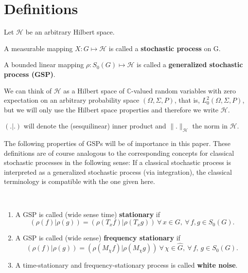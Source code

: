 \documentclass[graybox]{svmult}
\begin{document}
\section{Definitions}
\label{ch18:sec1}

\begin{definition}\label{ch18:def1}
Let $\mathcal{H}$ be an arbitrary Hilbert space.

A measurable mapping $X:G \mapsto \mathcal{H}$ is called a \textbf{stochastic process} on G.
\end{definition}

\begin{definition}\label{ch18:def2}
A bounded linear mapping $\rho :{S_{0}(G)} \mapsto \mathcal{H}$ is called a
\textbf{generalized stochastic process (GSP)}.
\end{definition}

We can think of $\mathcal{H}$ as a Hilbert space of
$\mathbb{C}$-valued random
variables with zero expectation on an arbitrary probability space
$(\varOmega ,\varSigma ,P)$, that is, $L^{2}_{0}(\varOmega ,\varSigma ,P)$, but we
will only use the Hilbert space properties and therefore we write $\mathcal{H}$.

$(.| .)$ will denote the (sesquilinear) inner
product and $\| .\| _{\mathcal{H}}$ the norm in $\mathcal{H}$.

The following properties of GSPs will be of importance in this paper.
These definitions are of course analogous to the corresponding concepts
for classical stochastic processes in the following sense:
If a classical stochastic process is interpreted as a
generalized stochastic process (via integration), the classical
terminology is compatible with the one given here.

\begin{definition}\label{ch18:def3}\
\begin{enumerate}
\item[(a)] A GSP is called (wide sense time) \textbf{stationary} if
\[
(\rho (f)| \rho (g)) = (\rho (T_{x}f)| \rho (T_{x}g)) \ \forall \, x
\in G, \ \forall \, f,g \in {S_{0}(G)}.
\]

\item[(b)] A GSP is called (wide sense) \textbf{frequency stationary} if
\[
(\rho (f)| \rho (g)) = (\rho (M_{\chi}f)| \rho (M_{\chi}g)) \ \forall \, \chi
\in \hat{G}, \ \forall \, f,\,g \in {S_{0}(G)}.
\]

\item[(c)] A time-stationary and frequency-stationary process is called
\textbf{white noise}.
\end{enumerate}
\end{definition}
\end{document}
